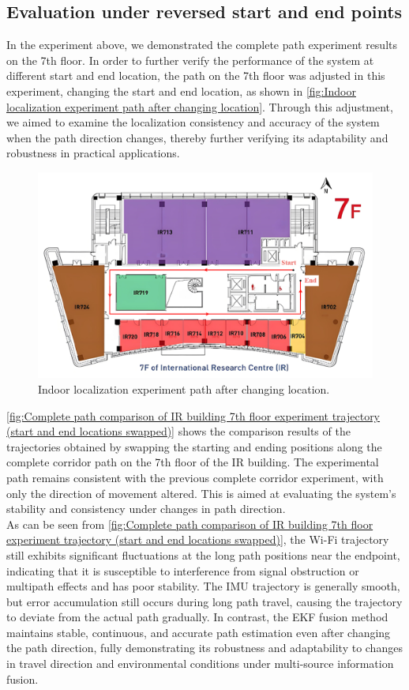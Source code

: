 \documentclass[12pt,a4paper]{article}
\numberwithin{equation}{section}
\begin{document}
\subsection{Evaluation under reversed start and end points}
\noindent In the experiment above, we demonstrated the complete path experiment results on the 7th floor. In order to further verify the performance of the system at different start and end location, the path on the 7th floor was adjusted in this experiment, changing the start and end location, as shown in \autoref{fig:Indoor localization experiment path after changing location}. Through this adjustment, we aimed to examine the localization consistency and accuracy of the system when the path direction changes, thereby further verifying its adaptability and robustness in practical applications.
\begin{figure}[H]
    \centering
    \includegraphics[width=0.9\linewidth]{images/ir_full_circle_inverse.png}
    \caption{Indoor localization experiment path after changing location.}
    \label{fig:Indoor localization experiment path after changing location}
\end{figure}
\noindent\autoref{fig:Complete path comparison of IR building 7th floor experiment trajectory (start and end locations swapped)} shows the comparison results of the trajectories obtained by swapping the starting and ending positions along the complete corridor path on the 7th floor of the IR building. The experimental path remains consistent with the previous complete corridor experiment, with only the direction of movement altered. This is aimed at evaluating the system's stability and consistency under changes in path direction.\\
As can be seen from \autoref{fig:Complete path comparison of IR building 7th floor experiment trajectory (start and end locations swapped)}, the Wi-Fi trajectory still exhibits significant fluctuations at the long path positions near the endpoint, indicating that it is susceptible to interference from signal obstruction or multipath effects and has poor stability. The IMU trajectory is generally smooth, but error accumulation still occurs during long path travel, causing the trajectory to deviate from the actual path gradually. In contrast, the EKF fusion method maintains stable, continuous, and accurate path estimation even after changing the path direction, fully demonstrating its robustness and adaptability to changes in travel direction and environmental conditions under multi-source information fusion.
\end{document}
